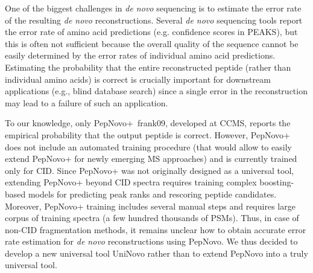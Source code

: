 
One of the biggest challenges in  {\em de novo} sequencing is to estimate the error rate of the resulting  {\em de novo} reconstructions.  
Several {\em de novo} sequencing tools report the error rate of amino acid predictions (e.g. confidence scores in PEAKS), but this is often not sufficient because the overall quality of the sequence cannot be easily determined by the error rates of individual amino acid predictions. 
%
Estimating the probability that the entire reconstructed peptide (rather than individual amino acids) is correct is crucially important for downstream applications (e.g., blind database search) since a single error in the reconstruction may lead to a failure of such an application. 

To our knowledge, only PepNovo+~\cite{unv}{frank09}, developed at CCMS,  reports the empirical probability that the output peptide is correct.
However,  PepNovo+ does not include an automated training procedure (that would allow to easily extend PepNovo+ for newly emerging MS approaches) and is currently trained only for CID. Since PepNovo+ was not originally designed as a universal tool, extending PepNovo+ beyond CID spectra requires training complex boosting-based models for predicting peak ranks and rescoring peptide candidates. Moreover, PepNovo+ training includes several manual steps and requires large corpus of training spectra (a few hundred thousands of PSMs).  Thus,   in case of non-CID fragmentation methods, it remains unclear how to obtain accurate error rate estimation for {\em de novo} reconstructions using PepNovo. We thus decided to develop a new universal tool UniNovo rather than to extend PepNovo into a truly universal tool. 

